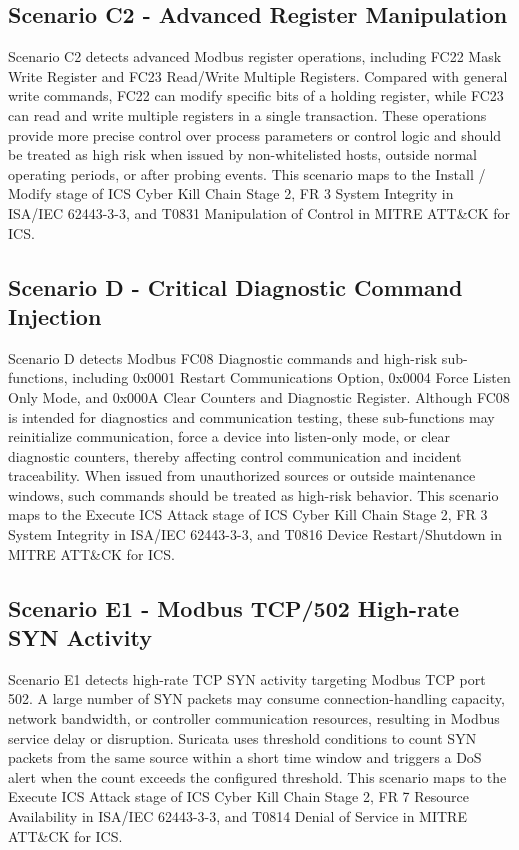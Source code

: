 \subsection{Scenario C2 - Advanced Register Manipulation}Scenario C2 detects advanced Modbus register operations, including FC22 Mask Write Register and FC23 Read/Write Multiple Registers. Compared with general write commands, FC22 can modify specific bits of a holding register, while FC23 can read and write multiple registers in a single transaction. These operations provide more precise control over process parameters or control logic and should be treated as high risk when issued by non-whitelisted hosts, outside normal operating periods, or after probing events. This scenario maps to the Install / Modify stage of ICS Cyber Kill Chain Stage 2, FR 3 System Integrity in ISA/IEC 62443-3-3, and T0831 Manipulation of Control in MITRE ATT\&CK for ICS.

\subsection{Scenario D - Critical Diagnostic Command Injection}Scenario D detects Modbus FC08 Diagnostic commands and high-risk sub-functions, including 0x0001 Restart Communications Option, 0x0004 Force Listen Only Mode, and 0x000A Clear Counters and Diagnostic Register. Although FC08 is intended for diagnostics and communication testing, these sub-functions may reinitialize communication, force a device into listen-only mode, or clear diagnostic counters, thereby affecting control communication and incident traceability. When issued from unauthorized sources or outside maintenance windows, such commands should be treated as high-risk behavior. This scenario maps to the Execute ICS Attack stage of ICS Cyber Kill Chain Stage 2, FR 3 System Integrity in ISA/IEC 62443-3-3, and T0816 Device Restart/Shutdown in MITRE ATT\&CK for ICS.

\subsection{Scenario E1 - Modbus TCP/502 High-rate SYN Activity}Scenario E1 detects high-rate TCP SYN activity targeting Modbus TCP port 502. A large number of SYN packets may consume connection-handling capacity, network bandwidth, or controller communication resources, resulting in Modbus service delay or disruption. Suricata uses threshold conditions to count SYN packets from the same source within a short time window and triggers a DoS alert when the count exceeds the configured threshold. This scenario maps to the Execute ICS Attack stage of ICS Cyber Kill Chain Stage 2, FR 7 Resource Availability in ISA/IEC 62443-3-3, and T0814 Denial of Service in MITRE ATT\&CK for ICS.

